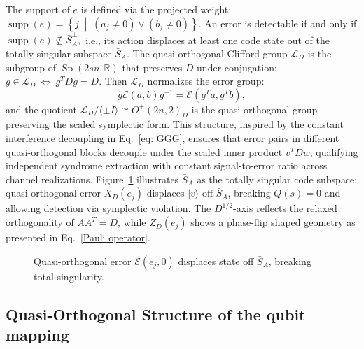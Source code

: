 \documentclass{iopjournal}
\theoremstyle{thmstyleone}%
\theoremstyle{thmstyletwo}%
\theoremstyle{thmstylethree}%
\begin{document}
The support of $e$ is defined via the projected weight:
\(
\operatorname{supp}(e) = \left\{ j \;\middle|\; (a_j \neq 0) \lor (b_j \neq 0) \right\}.
\)
An error is detectable if and only if
\(
\operatorname{supp}(e) \not\subseteq \bar{S}_A^\perp,
\)
i.e., its action displaces at least one code state out of the totally singular subspace $\bar{S}_A$. The quasi-orthogonal Clifford group $\mathcal{L}_D$ is the subgroup of $\operatorname{Sp}(2sn,\mathbb{R})$ that preserves $D$ under conjugation:
\(
g \in \mathcal{L}_D ~\Leftrightarrow ~ g^T D g = D.
\)
Then $\mathcal{L}_D$ normalizes the error group:
\begin{equation}
g \mathcal{E}(a,b) g^{-1} = \mathcal{E}(g^T a, g^T b),
\end{equation}
and the quotient $\mathcal{L}_D / \langle \pm I \rangle \cong O^+(2n,2)_D$ is the quasi-orthogonal group preserving the scaled symplectic form. This structure, inspired by the constant interference decoupling in Eq.~\eqref{eq: GGG}, ensures that error pairs in different quasi-orthogonal blocks decouple under the scaled inner product $v^T D w$, qualifying independent syndrome extraction with constant signal-to-error ratio across channel realizations. Figure~\ref{Quasi orth error} illustrates $\bar{S}_A$ as the totally singular code subspace; quasi-orthogonal error $X_D(e_j)$ displaces $|v\rangle$ off $\bar{S}_A$, breaking $Q(s)=0$ and allowing detection via symplectic violation. The $D^{1/2}$-axis reflects the relaxed orthogonality of $AA^T = D$, while $Z_D(e_j)$ shows a phase-flip shaped geometry as presented in Eq.~\eqref{Pauli operator}.

\begin{figure}[H]
\centering
{}
\caption{Quasi-orthogonal error $\mathcal{E}(e_j,0)$ displaces state off $\bar{S}_A$, breaking total singularity.}
\label{Quasi orth error}
\end{figure}


\subsection{Quasi-Orthogonal Structure of the qubit mapping}
\end{document}
